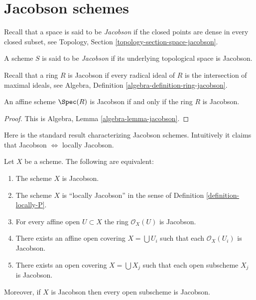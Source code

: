\section{Jacobson schemes}
\label{section-jacobson}

\noindent
Recall that a space is said to be {\it Jacobson} if the closed points are
dense in every closed subset, see
Topology, Section \ref{topology-section-space-jacobson}.

\begin{definition}
\label{definition-jacobson}
A scheme $S$ is said to be {\it Jacobson} if its underlying topological
space is Jacobson.
\end{definition}

\noindent
Recall that a ring $R$ is Jacobson if every radical ideal of $R$
is the intersection of maximal ideals, see
Algebra, Definition \ref{algebra-definition-ring-jacobson}.

\begin{lemma}
\label{lemma-affine-jacobson}
An affine scheme $\Spec(R)$ is Jacobson if and only if
the ring $R$ is Jacobson.
\end{lemma}

\begin{proof}
This is Algebra, Lemma \ref{algebra-lemma-jacobson}.
\end{proof}

\noindent
Here is the standard result characterizing Jacobson schemes.
Intuitively it claims that Jacobson $\Leftrightarrow$ locally Jacobson.

\begin{lemma}
\label{lemma-locally-jacobson}
Let $X$ be a scheme. The following are equivalent:
\begin{enumerate}
\item The scheme $X$ is Jacobson.
\item The scheme $X$ is ``locally Jacobson'' in the sense of
Definition \ref{definition-locally-P}.
\item For every affine open $U \subset X$ the ring $\mathcal{O}_X(U)$
is Jacobson.
\item There exists an affine open covering $X = \bigcup U_i$ such that
each $\mathcal{O}_X(U_i)$ is Jacobson.
\item There exists an open covering $X = \bigcup X_j$
such that each open subscheme $X_j$ is Jacobson.
\end{enumerate}
Moreover, if $X$ is Jacobson then every open subscheme
is Jacobson.
\end{lemma}

